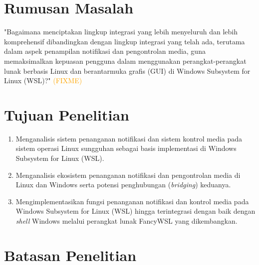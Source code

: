 \section{Rumusan Masalah}

"Bagaimana menciptakan lingkup integrasi yang lebih menyeluruh dan lebih komprehensif dibandingkan dengan lingkup integrasi yang telah ada, terutama dalam aspek penampilan notifikasi dan pengontrolan media, guna memaksimalkan kepuasan pengguna dalam menggunakan perangkat-perangkat lunak berbasis Linux dan berantarmuka grafis (GUI) di Windows Subsystem for Linux (WSL)?" \textcolor{orange}{(FIXME)}


\section{Tujuan Penelitian}

\begin{enumerate}
    \item Menganalisis sistem penanganan notifikasi dan sistem kontrol media pada sistem operasi Linux sungguhan sebagai basis implementasi di Windows Subsystem for Linux (WSL).

    \item Menganalisis ekosistem penanganan notifikasi dan pengontrolan media di Linux dan Windows serta potensi penghubungan (\textit{bridging}) keduanya.

    \item Mengimplementasikan fungsi penanganan notifikasi dan kontrol media pada Windows Subsystem for Linux (WSL) hingga terintegrasi dengan baik dengan \textit{shell} Windows melalui perangkat lunak FancyWSL yang dikembangkan.
\end{enumerate}


\section{Batasan Penelitian}

